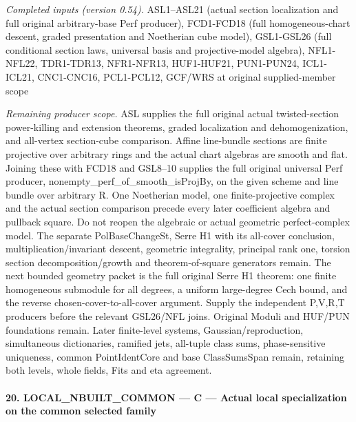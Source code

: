 \emph{Completed inputs (version 0.54).} ASL1–ASL21 (actual section localization and full original arbitrary-base Perf producer), FCD1-FCD18 (full homogeneous-chart descent, graded presentation and Noetherian cube model), GSL1-GSL26 (full conditional section laws, universal basis and projective-model algebra), NFL1-NFL22, TDR1-TDR13, NFR1-NFR13, HUF1-HUF21, PUN1-PUN24, ICL1-ICL21, CNC1-CNC16, PCL1-PCL12, GCF/WRS at original supplied-member scope

\emph{Remaining producer scope.} ASL supplies the full original actual twisted-section power-killing and extension theorems, graded localization and dehomogenization, and all-vertex section-cube comparison. Affine line-bundle sections are finite projective over arbitrary rings and the actual chart algebras are smooth and flat. Joining these with FCD18 and GSL8–10 supplies the full original universal Perf producer, nonempty\_\allowbreak perf\_\allowbreak of\_\allowbreak smooth\_\allowbreak isProjBy, on the given scheme and line bundle over arbitrary R. One Noetherian model, one finite-projective complex and the actual section comparison precede every later coefficient algebra and pullback square. Do not reopen the algebraic or actual geometric perfect-complex model. The separate PolBaseChangeSt, Serre H1 with its all-cover conclusion, multiplication/invariant descent, geometric integrality, principal rank one, torsion section decomposition/growth and theorem-of-square generators remain. The next bounded geometry packet is the full original Serre H1 theorem: one finite homogeneous submodule for all degrees, a uniform large-degree Cech bound, and the reverse chosen-cover-to-all-cover argument. Supply the independent P,V,R,T producers before the relevant GSL26/NFL joins. Original Moduli and HUF/PUN foundations remain. Later finite-level systems, Gaussian/reproduction, simultaneous dictionaries, ramified jets, all-tuple class sums, phase-sensitive uniqueness, common PointIdentCore and base ClassSumsSpan remain, retaining both levels, whole fields, Fits and eta agreement.



\paragraph{20. LOCAL\_\allowbreak NBUILT\_\allowbreak COMMON — C — Actual local specialization on the common selected family}

